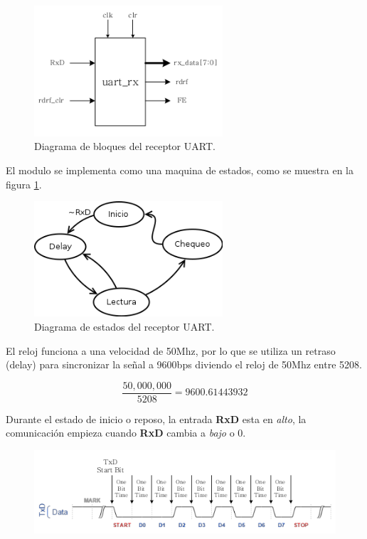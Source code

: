 \documentclass[11pt]{article}
\begin{document}
\begin{figure}[htb]
\centering
\includegraphics[width=7cm]{data/8d/f3fe04-f74c-41ea-a9f8-72c4f5d1492c/screenshot-20160222-142235.png}
\caption{Diagrama de bloques del receptor UART.}
\end{figure}

El modulo se implementa como una maquina de estados, como se
muestra en la figura \ref{fig:orgparagraph6}.

\begin{figure}[htb]
\centering
\includegraphics[width=7cm]{estados.png}
\caption{\label{fig:orgparagraph6}
Diagrama de estados del receptor UART.}
\end{figure}

El reloj funciona a una velocidad de 50Mhz, por lo que se utiliza un
retraso (delay) para sincronizar la señal a 9600bps diviendo el
reloj de 50Mhz entre 5208.

$$\frac{50,000,000}{5208}=9600.61443932$$

Durante el estado de inicio o reposo, la entrada \textbf{RxD} esta en
\emph{alto}, la comunicación empieza cuando \textbf{RxD} cambia a \emph{bajo} o
\(0\).

\begin{figure}[htb]
\centering
\includegraphics[width=.9\linewidth]{data/8d/f3fe04-f74c-41ea-a9f8-72c4f5d1492c/screenshot-20160222-154830.png}
\end{figure}
\end{document}

